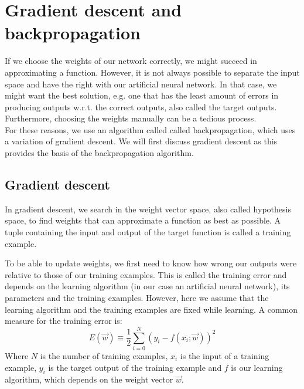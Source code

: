 
\section{Gradient descent and backpropagation} %
\label{sec:gradient_descent_and_backpropagation}
If we choose the weights of our network correctly, we might succeed in approximating a function.
However, it is not always possible to separate the input space and have the right with our artificial neural network.
In that case, we might want the best solution, e.g. one that has the least amount of errors in producing outputs w.r.t. the correct outputs, also called the target outputs. Furthermore, choosing the weights manually can be a tedious process.\\
For these reasons, we use an algorithm called called backpropagation, which uses a variation of gradient descent. We will first discuss gradient descent as this provides the basis of the backpropagation algorithm.

\subsection{Gradient descent} %
\label{ssub:gradient_descent}
In gradient descent, we search in the weight vector space, also called hypothesis space, to find weights that can approximate a function as best as possible. A tuple containing the input and output of the target function is called a training example.

To be able to update weights, we first need to know how wrong our outputs were relative to those of our training examples.
This is called the training error and depends on the learning algorithm (in our case an artificial neural network), its parameters and the training examples. However, here we assume that the learning algorithm and the training examples are fixed while learning.
A common measure for the training error is:
\begin{equation}
    E(\overrightarrow{w}) \equiv \frac{1}{2} \sum_{i=0}^N (y_i - f(x_i;\overrightarrow{w}))^2
\end{equation}
Where $N$ is the number of training examples, $x_i$ is the input of a training example, $y_i$ is the target output of the training example and $f$ is our learning algorithm, which depends on the weight vector $\overrightarrow{w}$.\\

